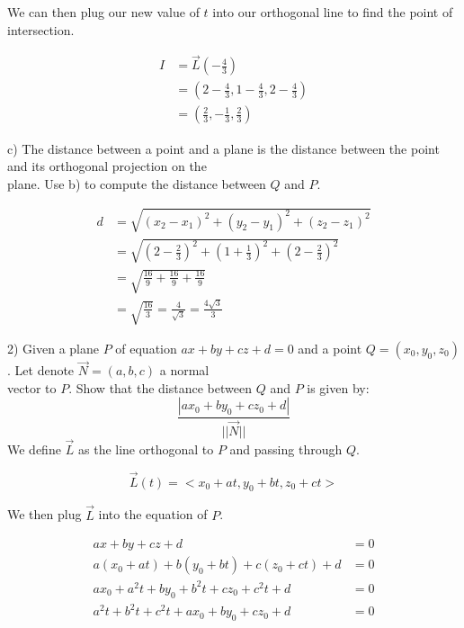 \documentclass{article}
\begin{document}
\begin{text}
\indent\indent We can then plug our new value of $t$ into our orthogonal line to find the point of intersection.
\end{text}

\begin{align*}
I &= \vec{L}(-\frac{4}{3}) \\
  &= (2 - \frac{4}{3}, 1 - \frac{4}{3}, 2 - \frac{4}{3}) \\
  &= (\frac{2}{3}, -\frac{1}{3}, \frac{2}{3})
\end{align*}

\begin{text}
\indent c) The distance between a point and a plane is the distance between the point and its orthogonal projection on the \\
\indent\indent\indent plane.  Use b) to compute the distance between $Q$ and $P$.
\end{text}

\begin{align*}
d &= \sqrt{(x_2 - x_1)^2 + (y_2 - y_1)^2 + (z_2 - z_1)^2} \\
&= \sqrt{(2 - \frac{2}{3})^2 + (1 + \frac{1}{3})^2 + (2 - \frac{2}{3})^2} \\
&= \sqrt{\frac{16}{9} + \frac{16}{9} + \frac{16}{9}} \\
&= \sqrt{\frac{16}{3}} = \frac{4}{\sqrt{3}} = \frac{4\sqrt{3}}{3}
\end{align*}

\newpage

\begin{text}
2) Given a plane $P$ of equation $ax + by + cz + d = 0$ and a point $Q = (x_0, y_0, z_0)$. Let denote $\vec{N} = (a, b, c)$ a normal \\
\indent\indent vector to $P$.  Show that the distance between $Q$ and $P$ is given by:
$$
\frac{|ax_0 + by_0 + cz_0 + d|}{||\vec{N}||}
$$
\indent\indent We define $\vec{L}$ as the line orthogonal to $P$ and passing through $Q$.
\end{text}

$$
\vec{L}(t) = <x_0 + at, y_0 + bt, z_0 + ct>
$$

\begin{text}
\indent We then plug $\vec{L}$ into the equation of $P$.
\end{text}

\begin{align*}
ax + by + cz + d &= 0 \\
a(x_0 + at) + b(y_0 + bt) + c(z_0 + ct) + d &= 0 \\
ax_0 + a^2t + by_0 + b^2t + cz_0 + c^2t + d &= 0 \\
a^2t + b^2t + c^2t + ax_0 + by_0 + cz_0 + d &= 0
\end{align*}
\end{document}
